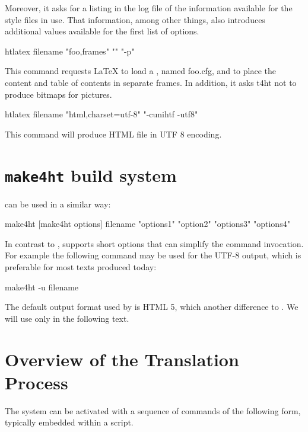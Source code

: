 Moreover, it asks for a listing in the log file of the information available
for the style files in use. That information, among other things, also
introduces additional values available for the first list of options.

\begin{shellcommand}
htlatex filename "foo,frames" "" "-p"
\end{shellcommand}

This command requests LaTeX to load a , named
foo.cfg, and to place the content and table of contents in separate frames. In
addition, it asks t4ht not to produce bitmaps for pictures. 

\begin{shellcommand}
htlatex filename "html,charset=utf-8" "-cunihtf -utf8"
\end{shellcommand}

This command will produce HTML file in UTF 8 encoding. 

\section{\texttt{make4ht} build system}

 can be used in a similar way:

\begin{shellcommand}
make4ht [make4ht options] filename "options1" "option2" "options3" "options4"
\end{shellcommand}

In contrast to ,  supports short options
that can simplify the command invocation. For example the following command may
be used for the UTF-8 output, which is preferable for most texts produced
today:

\begin{shellcommand}
make4ht -u filename
\end{shellcommand}

The default output format used by  is HTML 5, which another
difference to . We will use only  in the
following text.


\section{Overview of the Translation Process}\label{sec:overview}



The system can be activated with a sequence of commands of the following form, typically embedded within a script.

